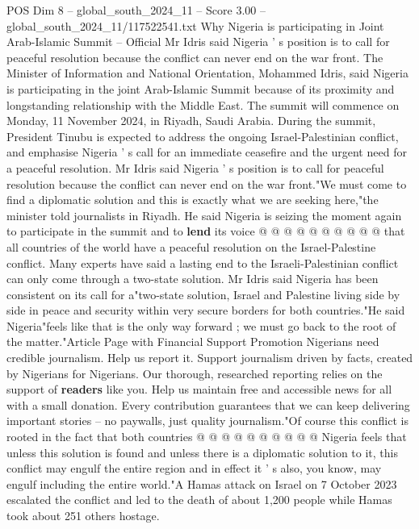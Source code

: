 \begin{textsample}{POS Dim 8 – global\_south\_2024\_11 – Score 3.00 – global\_south\_2024\_11/117522541.txt}  \label{ex:f8_pos_159}
Why Nigeria is participating in Joint Arab-Islamic Summit -- Official Mr Idris said Nigeria ' s position is to call for peaceful resolution because the conflict can never end on the war front.
The Minister of Information and National Orientation, Mohammed Idris, said Nigeria is participating in the joint Arab-Islamic Summit because of its proximity and longstanding relationship with the Middle East.
The summit will commence on Monday, 11 November 2024, in Riyadh, Saudi Arabia.
During the summit, President Tinubu is expected to address the ongoing Israel-Palestinian conflict, and emphasise Nigeria ' s call for an immediate ceasefire and the urgent need for a peaceful resolution.
Mr Idris said Nigeria ' s position is to call for peaceful resolution because the conflict can never end on the war front."We must come to find a diplomatic solution and this is exactly what we are seeking here,"the minister told journalists in Riyadh.
He said Nigeria is seizing the moment again to participate in the summit and to \textbf{lend} its voice @ @ @ @ @ @ @ @ @ @ that all countries of the world have a peaceful resolution on the Israel-Palestine conflict.
Many experts have said a lasting end to the Israeli-Palestinian conflict can only come through a two-state solution.
Mr Idris said Nigeria has been consistent on its call for a"two-state solution, Israel and Palestine living side by side in peace and security within very secure borders for both countries."He said Nigeria"feels like that is the only way forward ; we must go back to the root of the matter."Article Page with Financial Support Promotion Nigerians need credible journalism.
Help us report it.
Support journalism driven by facts, created by Nigerians for Nigerians.
Our thorough, researched reporting relies on the support of \textbf{readers} like you.
Help us maintain free and accessible news for all with a small donation.
Every contribution guarantees that we can keep delivering important stories -- no paywalls, just quality journalism."Of course this conflict is rooted in the fact that both countries @ @ @ @ @ @ @ @ @ @ Nigeria feels that unless this solution is found and unless there is a diplomatic solution to it, this conflict may engulf the entire region and in effect it ' s also, you know, may engulf including the entire world."A Hamas attack on Israel on 7 October 2023 escalated the conflict and led to the death of about 1,200 people while Hamas took about 251 others hostage.

\end{textsample}
